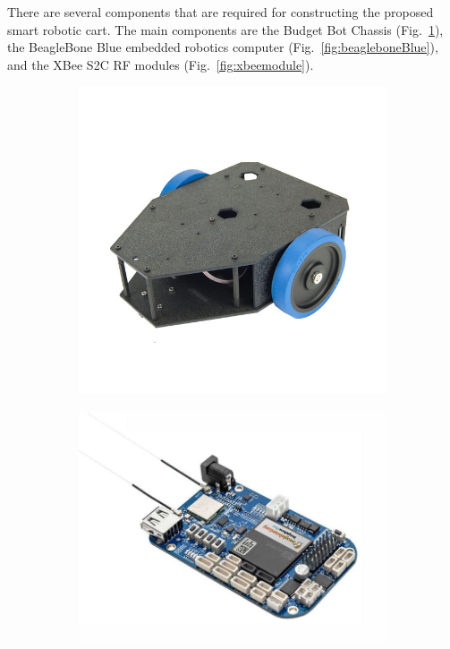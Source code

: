 \documentclass[conference]{IEEEtran}
\begin{document}
There are several components that are required for constructing the proposed
smart robotic cart. The main components are the Budget Bot Chassis
(Fig.~\ref{fig:budgetBotChassis}), the BeagleBone Blue embedded robotics
computer (Fig.~\ref{fig:beagleboneBlue}), and the XBee S2C RF modules
(Fig.~\ref{fig:xbeemodule}). %
%
\begin{figure}[htbp]
  \centering
  \begin{subfigure}[b]{0.3\linewidth}
    \includegraphics[width=1\textwidth]{figs/img/budgetbot_chassis}
    \caption{}
    \label{fig:budgetBotChassis}
  \end{subfigure}
  \begin{subfigure}[b]{0.3\linewidth}
    \includegraphics[width=1\textwidth]{figs/img/beaglebone_blue}

\end{subfigure}
\end{figure}
\end{document}
